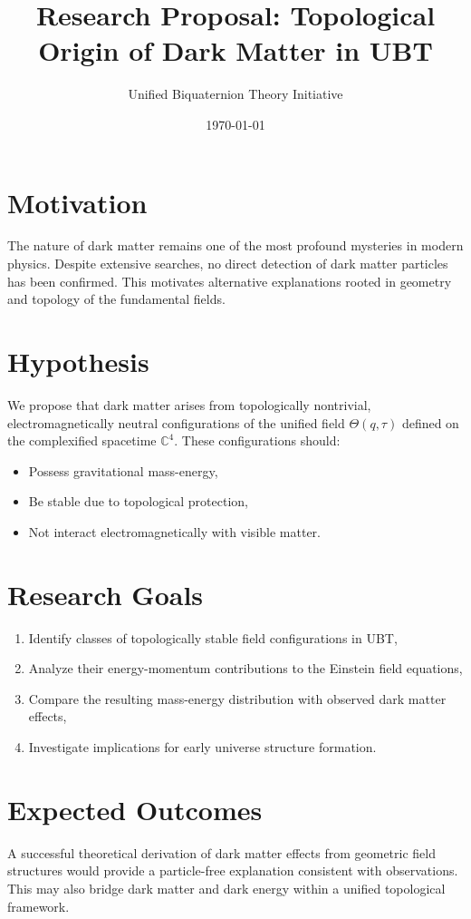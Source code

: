 \documentclass[12pt]{article}
\title{Research Proposal: Topological Origin of Dark Matter in UBT}
\author{Unified Biquaternion Theory Initiative}
\date{\today}
\begin{document}
\maketitle

\section*{Motivation}
The nature of dark matter remains one of the most profound mysteries in modern physics. Despite extensive searches, no direct detection of dark matter particles has been confirmed. This motivates alternative explanations rooted in geometry and topology of the fundamental fields.

\section*{Hypothesis}
We propose that dark matter arises from topologically nontrivial, electromagnetically neutral configurations of the unified field \( \Theta(q, \tau) \) defined on the complexified spacetime \( \mathbb{C}^4 \). These configurations should:

\begin{itemize}
  \item Possess gravitational mass-energy,
  \item Be stable due to topological protection,
  \item Not interact electromagnetically with visible matter.
\end{itemize}

\section*{Research Goals}
\begin{enumerate}
  \item Identify classes of topologically stable field configurations in UBT,
  \item Analyze their energy-momentum contributions to the Einstein field equations,
  \item Compare the resulting mass-energy distribution with observed dark matter effects,
  \item Investigate implications for early universe structure formation.
\end{enumerate}

\section*{Expected Outcomes}
A successful theoretical derivation of dark matter effects from geometric field structures would provide a particle-free explanation consistent with observations. This may also bridge dark matter and dark energy within a unified topological framework.
\end{document}
